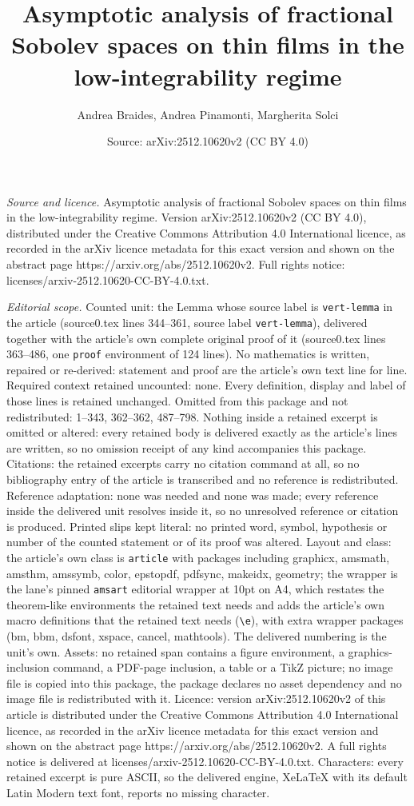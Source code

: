 \documentclass[10pt,a4paper]{amsart}
\title[Asymptotic analysis of fractional Sobolev spaces on thin fil]{Asymptotic analysis of fractional Sobolev spaces on thin films in the low-integrability regime}
\author{Andrea Braides, Andrea Pinamonti, Margherita Solci}
\date{Source: arXiv:2512.10620v2 (CC BY 4.0)}
\begin{document}
\maketitle

\noindent\emph{Source and licence.} Asymptotic analysis of fractional Sobolev spaces on thin films in the low-integrability regime. Version arXiv:2512.10620v2 (CC BY 4.0), distributed under the Creative Commons Attribution 4.0 International licence, as recorded in the arXiv licence metadata for this exact version and shown on the abstract page https://arxiv.org/abs/2512.10620v2. Full rights notice: licenses/arxiv-2512.10620-CC-BY-4.0.txt.\par\smallskip

\noindent\textit{Editorial scope.} Counted unit: the Lemma whose source label is \texttt{vert-lemma} in the article (source0.tex lines 344--361, source label \texttt{vert-lemma}), delivered together with the article's own complete original proof of it (source0.tex lines 363--486, one \texttt{proof} environment of 124 lines). No mathematics is written, repaired or re-derived: statement and proof are the article's own text line for line. Required context retained uncounted: none. Every definition, display and label of those lines is retained unchanged. Omitted from this package and not redistributed: 1--343, 362--362, 487--798. Nothing inside a retained excerpt is omitted or altered: every retained body is delivered exactly as the article's lines are written, so no omission receipt of any kind accompanies this package. Citations: the retained excerpts carry no citation command at all, so no bibliography entry of the article is transcribed and no reference is redistributed. Reference adaptation: none was needed and none was made; every reference inside the delivered unit resolves inside it, so no unresolved reference or citation is produced. Printed slips kept literal: no printed word, symbol, hypothesis or number of the counted statement or of its proof was altered. Layout and class: the article's own class is \texttt{article} with packages including graphicx, amsmath, amsthm, amssymb, color, epstopdf, pdfsync, makeidx, geometry; the wrapper is the lane's pinned \texttt{amsart} editorial wrapper at 10pt on A4, which restates the theorem-like environments the retained text needs and adds the article's own macro definitions that the retained text needs (\texttt{\textbackslash e}), with extra wrapper packages (bm, bbm, dsfont, xspace, cancel, mathtools). The delivered numbering is the unit's own. Assets: no retained span contains a figure environment, a graphics-inclusion command, a PDF-page inclusion, a table or a TikZ picture; no image file is copied into this package, the package declares no asset dependency and no image file is redistributed with it. Licence: version arXiv:2512.10620v2 of this article is distributed under the Creative Commons Attribution 4.0 International licence, as recorded in the arXiv licence metadata for this exact version and shown on the abstract page https://arxiv.org/abs/2512.10620v2. A full rights notice is delivered at licenses/arxiv-2512.10620-CC-BY-4.0.txt. Characters: every retained excerpt is pure ASCII, so the delivered engine, XeLaTeX with its default Latin Modern text font, reports no missing character.
\end{document}
